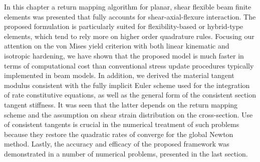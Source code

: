 In this chapter a return mapping algorithm for planar, shear 
flexible beam finite elements was presented that fully accounts for 
shear-axial-flexure 
interaction. The proposed formulation is particularly suited for 
flexibility-based or 
hybrid-type elements, which tend to rely more on higher order quadrature rules. 
Focusing our attention on the von Mises yield criterion with both linear 
kinematic and 
isotropic hardening, we have shown that the proposed model is much faster in 
terms of computational cost than 
conventional stress update procedures typically implemented in beam models. In 
addition, we derived the material tangent modulus consistent with the fully 
implicit Euler scheme used for the integration of rate constitutive equations, 
as well as the general form of the consistent section tangent stiffness. It was 
seen that 
the latter depends on the return mapping scheme and the assumption on shear 
strain 
distribution on the cross-section. Use of consistent tangents is crucial in the 
numerical treatment of such problems because they restore the quadratic rates 
of 
converge for the global Newton method. Lastly, the accuracy and efficacy of the 
proposed 
framework was demonstrated in a number of numerical problems, presented in the 
last section. 